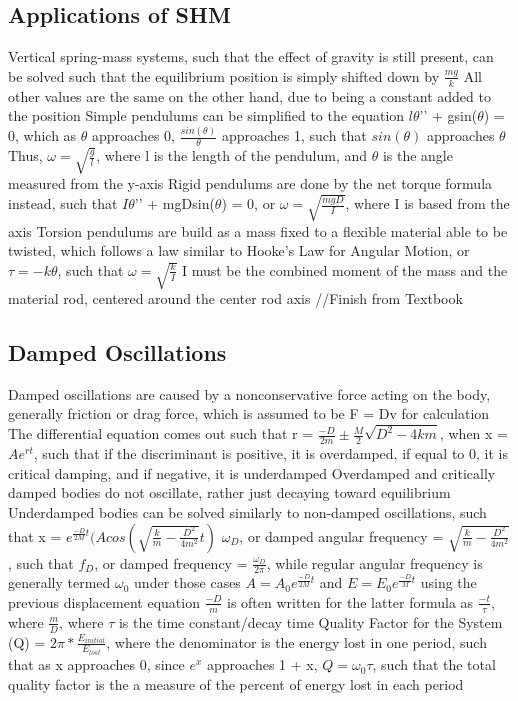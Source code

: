 \documentclass[11 pt, twoside]{article}
\newenvironment{outline*}
{
	\begin{outline}[enumerate]
	}
	{\end{outline}
}
\begin{document}
\subsection{Applications of SHM}
\begin{outline*}
\1 Vertical spring-mass systems, such that the effect of gravity is still present, can be solved such that the equilibrium position is simply shifted down by $\frac{mg}{k}$
\2 All other values are the same on the other hand, due to being a constant added to the position
\1 Simple pendulums can be simplified to the equation $l\theta$’’ + gsin($\theta$) = 0, which as $\theta$ approaches 0, $\frac{sin(\theta)}{\theta}$ approaches 1, such that $sin(\theta)$ approaches $\theta$
\2 Thus, $\omega = \sqrt{\frac{g}{l}}$, where l is the length of the pendulum, and $\theta$ is the angle measured from the y-axis
\1 Rigid pendulums are done by the net torque formula instead, such that $I\theta$’’ + mgDsin($\theta$) = 0, or $\omega = \sqrt{\frac{mgD}{I}}$, where I is based from the axis
\1 Torsion pendulums are build as a mass fixed to a flexible material able to be twisted, which follows a law similar to Hooke’s Law for Angular Motion, or $\tau = -k\theta$, such that $\omega = \sqrt{\frac{k}{I}}$
\2 I must be the combined moment of the mass and the material rod, centered around the center rod axis
\1 //Finish from Textbook
\end{outline*}
\subsection{Damped Oscillations}
\begin{outline*}
\1 Damped oscillations are caused by a nonconservative force acting on the body, generally friction or drag force, which is assumed to be F = Dv for calculation
\1 The differential equation comes out such that r = $\frac{-D}{2m} \pm \frac{M}{2}\sqrt{D^2 - 4km}$, when x = $Ae^{rt}$, such that if the discriminant is positive, it is overdamped, if equal to 0, it is critical damping, and if negative, it is underdamped
\2 Overdamped and critically damped bodies do not oscillate, rather just decaying toward equilibrium
\2 Underdamped bodies can be solved similarly to non-damped oscillations, such that x = $e^{\frac{-D}{2M}t}(Acos(\sqrt{\frac{k}{m} - \frac{D^2}{4m^2}}t)$
\1 $\omega_D$, or damped angular frequency = $\sqrt{\frac{k}{m} - \frac{D^2}{4m^2}}$, such that $f_D$, or damped frequency = $\frac{\omega_D}{2\pi}$, while regular angular frequency is generally termed $\omega_0$ under those cases
\1 $A = A_0e^{\frac{-D}{2M}t}$ and $E = E_0e^{\frac{-D}{M}t}$ using the previous displacement equation
\2 $\frac{-D}{m}$ is often written for the latter formula as $\frac{-t}{\tau}$, where $\frac{m}{D}$, where $\tau$ is the time constant/decay time
\2 Quality Factor for the System (Q) = $2\pi * \frac{E_{initial}}{E_{lost}}$, where the denominator is the energy lost in one period, such that as x approaches 0, since $e^x$ approaches 1 + x, $Q = \omega_0 \tau$, such that the total quality factor is the a measure of the percent of energy lost in each period
\end{outline*}
\end{document}
